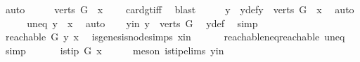 \begin{isabellebody}
\ auto\isanewline
\ \ \isamarkupfalse%
\ \isamarkupfalse%
\ {\isachardoublequoteopen}{\isacharparenleft}{\kern0pt}{\isacharparenleft}{\kern0pt}verts\ G{\isacharparenright}{\kern0pt}\ {\isacharminus}{\kern0pt}\ {\isacharbraceleft}{\kern0pt}x{\isacharbraceright}{\kern0pt}{\isacharparenright}{\kern0pt}\ {\isasymnoteq}\ {\isacharbraceleft}{\kern0pt}{\isacharbraceright}{\kern0pt}{\isachardoublequoteclose}\ \isamarkupfalse%
\ card{\isacharunderscore}{\kern0pt}gt{\isacharunderscore}{\kern0pt}{}{\isacharunderscore}{\kern0pt}iff\ \isamarkupfalse%
\ blast\isanewline
\ \ \isamarkupfalse%
\ \isamarkupfalse%
\ y\ \ y{\isacharunderscore}{\kern0pt}def{\isacharcolon}{\kern0pt}{\isachardoublequoteopen}y\ {\isasymin}\ {\isacharparenleft}{\kern0pt}verts\ G{\isacharparenright}{\kern0pt}\ {\isacharminus}{\kern0pt}\ {\isacharbraceleft}{\kern0pt}x{\isacharbraceright}{\kern0pt}{\isachardoublequoteclose}\ \isamarkupfalse%
\ auto\isanewline
\ \ \isamarkupfalse%
\ \isamarkupfalse%
\ uneq{\isacharcolon}{\kern0pt}\ {\isachardoublequoteopen}y\ {\isasymnoteq}\ x{\isachardoublequoteclose}\ \isamarkupfalse%
\ auto\isanewline
\ \ \isamarkupfalse%
\ y{\isacharunderscore}{\kern0pt}in{\isacharcolon}{\kern0pt}\ {\isachardoublequoteopen}y\ {\isasymin}\ {\isacharparenleft}{\kern0pt}verts\ G{\isacharparenright}{\kern0pt}{\isachardoublequoteclose}\ \isamarkupfalse%
\ y{\isacharunderscore}{\kern0pt}def\ \isamarkupfalse%
\ simp\isanewline
\ \ \isamarkupfalse%
\ \isamarkupfalse%
\ {\isachardoublequoteopen}reachable{}\ G\ y\ x{\isachardoublequoteclose}\ \isamarkupfalse%
\ is{\isacharunderscore}{\kern0pt}genesis{\isacharunderscore}{\kern0pt}node{\isachardot}{\kern0pt}simps\ x{\isacharunderscore}{\kern0pt}in\isanewline
\ \ \ \ \ \ reachable{\isacharunderscore}{\kern0pt}neq{\isacharunderscore}{\kern0pt}reachable{}\ uneq\ \isamarkupfalse%
\ simp\isanewline
\ \ \isamarkupfalse%
\ \isamarkupfalse%
\ {\isachardoublequoteopen}{\isasymnot}\ is{\isacharunderscore}{\kern0pt}tip\ G\ x{\isachardoublequoteclose}\isanewline
\ \ \ \ \isamarkupfalse%
\ {\isacharparenleft}{\kern0pt}meson\ is{\isacharunderscore}{\kern0pt}tip{\isachardot}{\kern0pt}elims{\isacharparenleft}{\kern0pt}{}{\isacharparenright}{\kern0pt}\ y{\isacharunderscore}{\kern0pt}in{\isacharparenright}{\kern0pt}\ \isanewline

\end{isabellebody}
